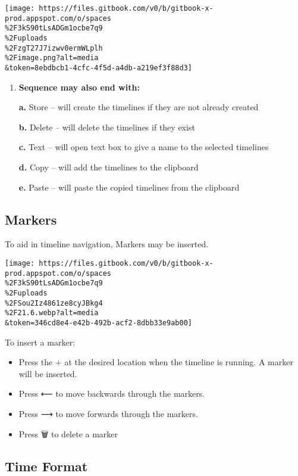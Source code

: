 \documentclass[
]{article}
\begin{document}
\texttt{[image: https://files.gitbook.com/v0/b/gitbook-x-prod.appspot.com/o/spaces\\\%2F3kS90tLsADGm1ocbe7q9\\\%2Fuploads\\\%2FzgT27J7izwv0ermWLplh\\\%2Fimage.png?alt=media\\\&token=8ebdbcb1-4cfc-4f5d-a4db-a219ef3f88d3]}

\begin{enumerate}
\def\labelenumi{\arabic{enumi}.}
\setcounter{enumi}{3}
\item
  \textbf{Sequence may also end with:}

  \textbf{a.} Store -- will create the timelines if they are not already created

  \textbf{b.} Delete -- will delete the timelines if they exist

  \textbf{c.} Text -- will open text box to give a name to the selected timelines

  \textbf{d.} Copy -- will add the timelines to the clipboard

  \textbf{e.} Paste -- will paste the copied timelines from the clipboard
\end{enumerate}

\hypertarget{markers}{%
\subsection{Markers}\label{markers}}

To aid in timeline navigation, Markers may be inserted.

\texttt{[image: https://files.gitbook.com/v0/b/gitbook-x-prod.appspot.com/o/spaces\\\%2F3kS90tLsADGm1ocbe7q9\\\%2Fuploads\\\%2FSou2Iz4861ze8cyJBkg4\\\%2F21.6.webp?alt=media\\\&token=346cd8e4-e42b-492b-acf2-8dbb33e9ab00]}

To insert a marker:

\begin{itemize}
\item
  Press the + at the desired location when the timeline is running. A marker will be inserted.
\item
  Press ⟵ to move backwards through the markers.
\item
  Press ⟶ to move forwards through the markers.
\item
  Press 🗑️ to delete a marker
\end{itemize}

\hypertarget{time-format}{%
\subsection{Time Format}\label{time-format}}
\end{document}
